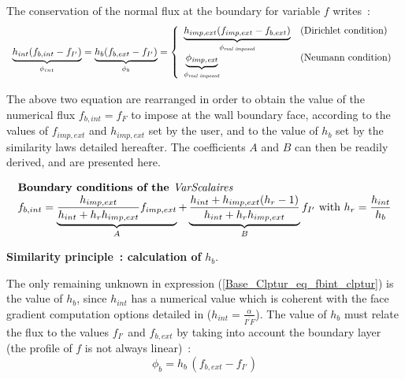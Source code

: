 The conservation of the normal flux at the boundary for variable $f$ writes~:
\begin{equation}\label{Base_Clptur_eq_flux_clptur}
\begin{array}{l}
    \underbrace{h_{int}(f_{b,int}-f_{I'})}_{\phi_{int}}
  = \underbrace{h_{b}(f_{b,ext}-f_{I'})}_{\phi_{b}}
  = \left\{\begin{array}{ll}
    \underbrace{h_{imp,ext}(f_{imp,ext}-f_{b,ext})}_{\phi_{\text{\it real
imposed}}} &\text{(Dirichlet condition)}\\
    \underbrace{\phi_{\text{\it imp,ext}}}_{\phi_{\text{\it real imposed}}}
            &\text{(Neumann condition)}
           \end{array}\right.
\end{array}
\end{equation}

The above two equation are rearranged in order to obtain the value of the
numerical flux $f_{b,int}=f_{F}$ to impose at the wall boundary face,
according to the values of $f_{imp,ext}$ and $h_{imp,ext}$ set by the user,
and to the value of  $h_{b}$ set by the similarity laws detailed hereafter.
The coefficients $A$ and $B$  can then be readily derived, and are presented here.

\begin{equation}\label{Base_Clptur_eq_fbint_clptur}
\begin{array}{l}
\text{\bf Boundary conditions of the {\it VarScalaires} }\\
f_{b,int} =
\underbrace{\displaystyle\frac{h_{imp,ext}}{h_{int}+h_r h_{imp,ext} } f_{imp,ext}}_{A} +
\underbrace{\displaystyle\frac{h_{int}+h_{imp,ext}(h_r-1)}{h_{int}+h_r h_{imp,ext} }}_{B} f_{I'}
\text{  with } h_r=\displaystyle\frac{h_{int}}{h_{b}}
\end{array}
\end{equation}


\newpage
{\bf Similarity principle~: calculation of } $h_b$.

The only remaining unknown in expression (\ref{Base_Clptur_eq_fbint_clptur})
is the value of $h_{b}$, since  $h_{int}$ has a numerical value which
is coherent with the face gradient computation options detailed in
  ($h_{int}=\displaystyle\frac{\alpha}{\overline{I'F}}$).
The value of  $h_{b}$ must relate the flux to the values
$f_{I'}$ and $f_{b,ext}$ by taking into account the boundary layer
(the profile of $f$ is not always linear)~:
\begin{equation}
\phi_b=h_b\,(f_{b,ext}-f_{I'})
\end{equation}


